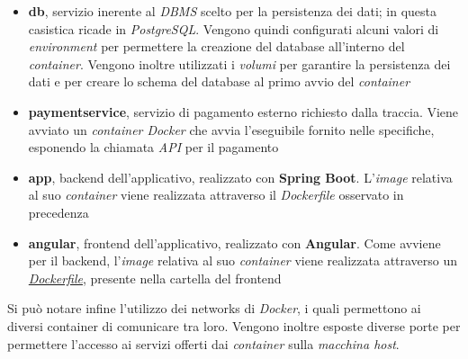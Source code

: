 \documentclass{article}
\begin{document}
\begin{itemize}[label = {-}]
    \itemsep0em
    \item \textbf{db}, servizio inerente al \textit{DBMS} scelto per la persistenza dei dati; in questa casistica ricade in \textit{PostgreSQL}. Vengono quindi configurati alcuni valori di \textit{environment} per permettere la creazione del database all'interno del \textit{container}. Vengono inoltre utilizzati i \textit{volumi} per garantire la persistenza dei dati e per creare lo schema del database al primo avvio del \textit{container}
    \item \textbf{paymentservice}, servizio di pagamento esterno richiesto dalla traccia. Viene avviato un \textit{container Docker} che avvia l'eseguibile fornito nelle specifiche, esponendo la chiamata \textit{API} per il pagamento
    \item \textbf{app}, backend dell'applicativo, realizzato con \textbf{Spring Boot}. L'\textit{image} relativa al suo \textit{container} viene realizzata attraverso il \textit{Dockerfile} osservato in precedenza
    \item \textbf{angular}, frontend dell'applicativo, realizzato con \textbf{Angular}. Come avviene per il backend, l'\textit{image} relativa al suo \textit{container} viene realizzata attraverso un \href{https://github.com/DavideDeRosa/storJ_SWE/blob/develop/frontend/Dockerfile}{\textit{Dockerfile}}, presente nella cartella del frontend
\end{itemize}
Si può notare infine l'utilizzo dei networks di \textit{Docker}, i quali permettono ai diversi container di comunicare tra loro. Vengono inoltre esposte diverse porte per permettere l'accesso ai servizi offerti dai \textit{container} sulla \textit{macchina host}.
\end{document}
